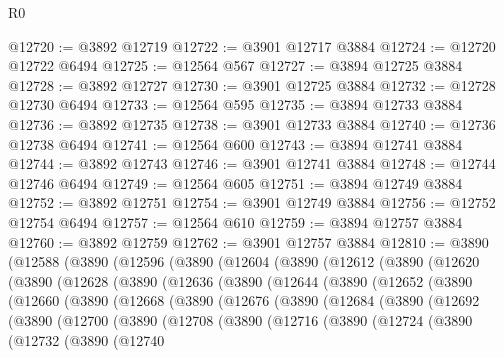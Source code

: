 \begin{lexlean}{R0}
\begin{coremodule}
@12720 := @3892 @12719
@12722 := @3901 @12717 @3884
@12724 := @12720 @12722 @6494
@12725 := @12564 @567
@12727 := @3894 @12725 @3884
@12728 := @3892 @12727
@12730 := @3901 @12725 @3884
@12732 := @12728 @12730 @6494
@12733 := @12564 @595
@12735 := @3894 @12733 @3884
@12736 := @3892 @12735
@12738 := @3901 @12733 @3884
@12740 := @12736 @12738 @6494
@12741 := @12564 @600
@12743 := @3894 @12741 @3884
@12744 := @3892 @12743
@12746 := @3901 @12741 @3884
@12748 := @12744 @12746 @6494
@12749 := @12564 @605
@12751 := @3894 @12749 @3884
@12752 := @3892 @12751
@12754 := @3901 @12749 @3884
@12756 := @12752 @12754 @6494
@12757 := @12564 @610
@12759 := @3894 @12757 @3884
@12760 := @3892 @12759
@12762 := @3901 @12757 @3884
@12810 := @3890
    (@12588
      (@3890
        (@12596
          (@3890
            (@12604
              (@3890
                (@12612
                  (@3890
                    (@12620
                      (@3890
                        (@12628
                          (@3890
                            (@12636
                              (@3890
                                (@12644
                                  (@3890
                                    (@12652
                                      (@3890
                                        (@12660
                                          (@3890
                                            (@12668
                                              (@3890
                                                (@12676
                                                  (@3890
                                                    (@12684
                                                      (@3890
                                                        (@12692
                                                          (@3890
                                                            (@12700
                                                              (@3890
                                                                (@12708
                                                                  (@3890
                                                                    (@12716
                                                                      (@3890
                                                                        (@12724
                                                                          (@3890
                                                                            (@12732
                                                                              (@3890
                                                                                (@12740

\end{coremodule}
\end{lexlean}
